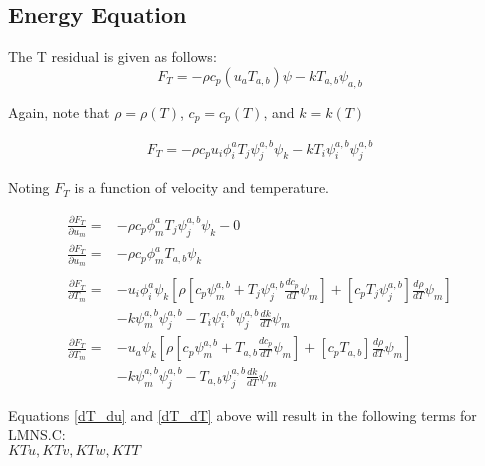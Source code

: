 \newpage
\subsection{Energy Equation}
The T residual is given as follows:
\begin{equation}
    F_T = -\rho c_p (u_a T_{a,b})\psi - k T_{a,b} \psi_{a,b}
\end{equation}

Again, note that $\rho = \rho(T)$, $c_p = c_p(T)$, and $k = k(T)$

\begin{align}
    F_T = -\rho c_p u_i \phi_i^a T_j \psi_j^{a,b} \psi_k - k T_i \psi_i^{a,b} \psi_j^{a,b}
\end{align}

Noting $F_T$ is a function of velocity and temperature.

\begin{align}
    \frac{\partial F_T}{\partial u_m} = &-\rho c_p \phi_m^a T_j \psi_j^{a,b} \psi_k - 0 \nonumber \\
    \frac{\partial F_T}{\partial u_m} = &-\rho c_p \phi_m^a T_{a,b} \psi_k \label{dT_du} \\
    \nonumber \\
    \frac{\partial F_T}{\partial T_m} = &-u_i \phi_i^a \psi_k \left [ \rho [ c_p \psi_m^{a,b} + T_j \psi_j^{a,b} \frac{d c_p}{dT} \psi_m ] + [ c_p T_j \psi_j^{a,b} ] \frac{d \rho}{dT} \psi_m  \right ] \nonumber \\
                                      &- k \psi_m^{a,b} \psi_j^{a,b} - T_i \psi_i^{a,b} \psi_j^{a,b} \frac{dk}{dT} \psi_m \nonumber \\
    \frac{\partial F_T}{\partial T_m} = &-u_a \psi_k \left [ \rho [ c_p \psi_m^{a,b} + T_{a,b} \frac{d c_p}{dT} \psi_m ] + [ c_p T_{a,b} ] \frac{d \rho}{dT} \psi_m  \right ] \nonumber \\
                                      &- k \psi_m^{a,b} \psi_j^{a,b} - T_{a,b} \psi_j^{a,b} \frac{dk}{dT} \psi_m \label{dT_dT}
\end{align}

Equations \ref{dT_du} and \ref{dT_dT} above will result in the following terms for LMNS.C:\\
$KTu, KTv, KTw, KTT$


